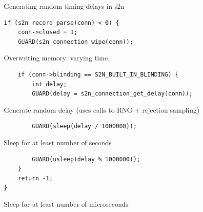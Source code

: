 \documentclass[presentation,smaller]{beamer}
\begin{document}
\begin{frame}[fragile,label={sec:orgheadline19}]{Generating random timing delays in s2n}
 \lstset{language=C,label= ,caption= ,captionpos=b,numbers=none}
\begin{lstlisting}
if (s2n_record_parse(conn) < 0) {
    conn->closed = 1;
    GUARD(s2n_connection_wipe(conn));
\end{lstlisting}

\footnotesize Overwriting memory: varying time.

\lstset{language=C,label= ,caption= ,captionpos=b,numbers=none}
\begin{lstlisting}
    if (conn->blinding == S2N_BUILT_IN_BLINDING) {
        int delay;
        GUARD(delay = s2n_connection_get_delay(conn));
\end{lstlisting}

Generate random delay (uses calls to RNG + rejection sampling)

\lstset{language=C,label= ,caption= ,captionpos=b,numbers=none}
\begin{lstlisting}
        GUARD(sleep(delay / 1000000));
\end{lstlisting}

Sleep for at least number of seconds

\lstset{language=C,label= ,caption= ,captionpos=b,numbers=none}
\begin{lstlisting}
        GUARD(usleep(delay % 1000000));
    }
    return -1;
}
\end{lstlisting}

Sleep for at least number of microseconds
\end{frame}
\end{document}

